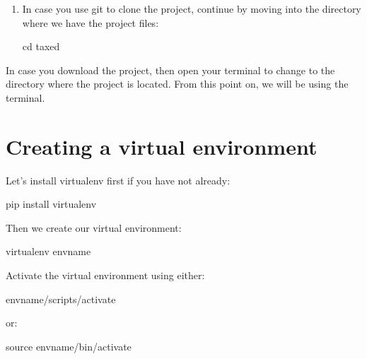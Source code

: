 \documentclass[letterpaper,10pt,english]{sphinxmanual}
\begin{document}
\noindent{}
\begin{enumerate}
%
\setcounter{enumi}{1}
\item {} 
\sphinxAtStartPar
In case you use git to clone the project, continue by moving into the directory where we have the project files:

\begin{sphinxVerbatim}[commandchars=\\\{\}]
\PYGZdl{} cd taxed
\end{sphinxVerbatim}

\end{enumerate}

\sphinxAtStartPar
In case you download the project, then open your terminal to change to the directory where the project is located.
From this point on, we will be using the terminal.


\section{Creating a virtual environment}
\label{\detokenize{pages/installation-testing:creating-a-virtual-environment}}
\sphinxAtStartPar
Let’s install virtualenv first if you have not already:

\begin{sphinxVerbatim}[commandchars=\\\{\}]
\PYGZdl{} pip install virtualenv
\end{sphinxVerbatim}

\sphinxAtStartPar
Then we create our virtual environment:

\begin{sphinxVerbatim}[commandchars=\\\{\}]
\PYGZdl{} virtualenv envname
\end{sphinxVerbatim}

\sphinxAtStartPar
Activate the virtual environment using either:

\begin{sphinxVerbatim}[commandchars=\\\{\}]
\PYGZdl{} envname/scripts/activate
\end{sphinxVerbatim}

\sphinxAtStartPar
or:

\begin{sphinxVerbatim}[commandchars=\\\{\}]
\PYGZdl{} source envname/bin/activate
\end{sphinxVerbatim}
\end{document}
